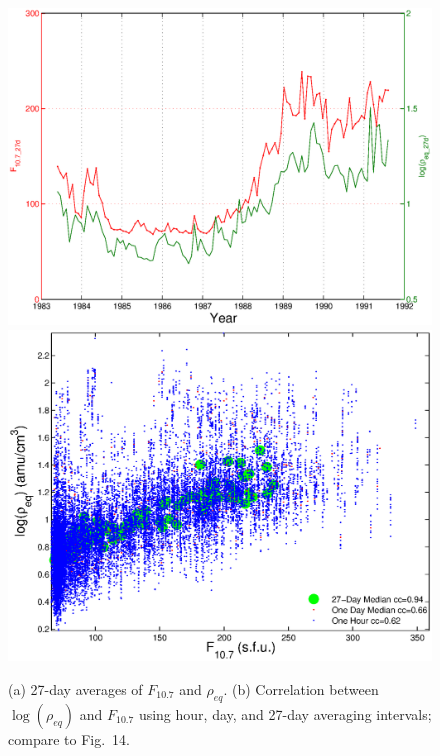 \documentclass[10pt,twocolumn]{article}
\begin{document}
\begin{figure}[htp!]
\centering
\subcaptionbox{\label{ccplot:a}}
{\includegraphics[scale=0.40]{paperfigures/F107MDAllData.eps}}
\subcaptionbox{\label{ccplot:b}}
{\includegraphics[scale=0.40]{paperfigures/ccplot.eps}}
\caption{(a) 27-day averages of $F_{10.7}$ and $\rho_{eq}$. (b) Correlation between $\log(\rho_{eq})$ and $F_{10.7}$ using hour, day, and 27-day averaging intervals; compare to \cite{Takahashi2010} Fig.~14.}
\label{ccplot}
\end{figure}
\clearpage
\end{document}
